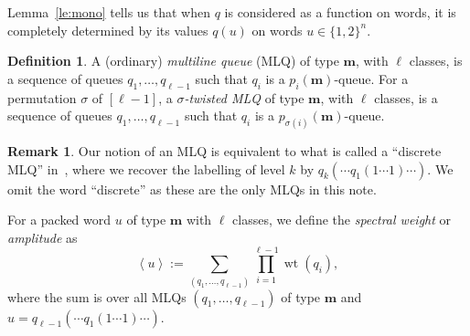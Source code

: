 \documentclass[submission]{FPSAC2018}
\newcommand{\fs}{\mathcal{S}} %
\newcommand{\swt}[1]{\left\langle #1 \right\rangle} %
\DeclareMathOperator{\wt}{wt} %
\newcommand{\xx}{\mathbf{x}}
\newcommand{\mm}{\mathbf{m}}
\newcommand{\mcF}{\mathcal{F}}
\newcommand{\set}[1]{\left\{ #1 \right\}}
\newcommand{\ive}[1]{\left[ #1 \right]}
\newcommand{\defn}[1]{{\color{darkred}\emph{#1}}} %
\theoremstyle{plain}
\theoremstyle{definition}
\newtheorem{dfn}[thm]{Definition}
\newtheorem{remark}[thm]{Remark}
\numberwithin{equation}{section}
\begin{document}
Lemma~\ref{le:mono} tells us that when $q$ is considered as a function on words, it is completely determined by its values $q(u)$ on words $u \in \{1,2\}^n$.

\begin{dfn}
A (ordinary) \defn{multiline queue} (MLQ) of type $\mm$, with $\ell$ classes, is a sequence of queues $q_1, \dotsc, q_{\ell-1}$ such that $q_i$ is a $p_i(\mm)$-queue.
For a permutation $\sigma$ of $\ive{\ell-1}$, a \defn{$\sigma$-twisted MLQ} of type $\mm$, with $\ell$ classes, is a sequence of queues $q_1, \dotsc, q_{\ell-1}$ such that $q_i$ is a $p_{\sigma(i)}(\mm)$-queue.
\end{dfn}

\begin{remark}
Our notion of an MLQ is equivalent to what is called a ``discrete MLQ'' in~\cite[\S 2.2]{AasLin17}, where we recover the labelling of level $k$ by $q_k( \cdots q_1(1 \dotsm 1) \cdots )$.
We omit the word ``discrete'' as these are the only MLQs in this note.
\end{remark}

For a packed word $u$ of type $\mm$ with $\ell$ classes, we define the \defn{spectral weight} or \defn{amplitude} as
\begin{equation}
\label{eq:amplitude}
  \swt{u} := \sum_{(q_1, \dotsc, q_{\ell-1})} \prod_{i=1}^{\ell-1} \wt(q_i),
\end{equation}
where the sum is over all MLQs $(q_1, \dotsc, q_{\ell-1})$ of type $\mm$ and $u = q_{\ell-1}( \cdots q_1(1 \dotsm 1) \cdots )$.


%
\end{document}
